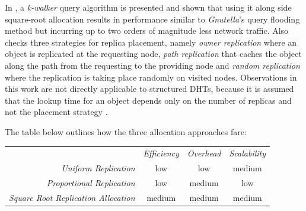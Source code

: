 In \cite{LCCLS2002}, a \emph{k-walker} query algorithm is presented and shown
that using it along side square-root allocation results in performance similar to
{\sl Gnutella}'s query flooding method but incurring up to two
orders of magnitude less network traffic. Also checks three strategies for
replica placement, namely \emph{owner replication} where an object is replicated
at the requesting node, \emph{path replication} that caches the object along the
path from the requesting to the providing node and \emph{random replication}
where the replication is taking place randomly on visited nodes. Observations in
this work are not directly applicable to structured DHTs, because it is assumed
that the lookup time for an object depends only on the number of replicas and
not the placement strategy \cite{RS2004}.


The table below outlines how the three allocation approaches fare:
\begin{center}
{\footnotesize
\begin{tabular}{rccc}
\multicolumn{1}{r}{} &
\multicolumn{1}{c}{\emph{Efficiency}} &
\multicolumn{1}{c}{\emph{Overhead}} &
\multicolumn{1}{c}{\emph{Scalability}}
\\
\cline{2-4}
\emph{Uniform Replication} &
low &
low &
%
medium \\
\emph{Proportional Replication} &
low &
medium &
%
low \\
\emph{Square Root Replication Allocation} &
medium &
medium &
medium \\
\end{tabular}
}
\end{center}

